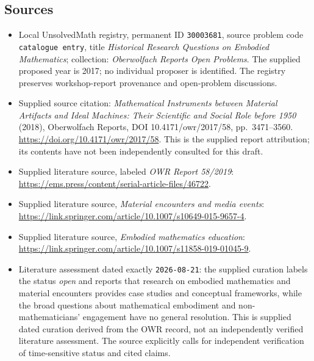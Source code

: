 \documentclass[11pt]{article}
\begin{document}
\subsection{Sources}
\begin{itemize}
\item Local UnsolvedMath registry, permanent ID \texttt{30003681}, source problem code \texttt{catalogue entry}, title \emph{Historical Research Questions on Embodied Mathematics}; collection: \emph{Oberwolfach Reports Open Problems}. The supplied proposed year is 2017; no individual proposer is identified. The registry preserves workshop-report provenance and open-problem discussions.
\item Supplied source citation: \emph{Mathematical Instruments between Material Artifacts and Ideal Machines: Their Scientific and Social Role before 1950} (2018), Oberwolfach Reports, DOI 10.4171/owr/2017/58, pp.\ 3471--3560. \url{https://doi.org/10.4171/owr/2017/58}. This is the supplied report attribution; its contents have not been independently consulted for this draft.
\item Supplied literature source, labeled \emph{OWR Report 58/2019}: \url{https://ems.press/content/serial-article-files/46722}.
\item Supplied literature source, \emph{Material encounters and media events}: \url{https://link.springer.com/article/10.1007/s10649-015-9657-4}.
\item Supplied literature source, \emph{Embodied mathematics education}: \url{https://link.springer.com/article/10.1007/s11858-019-01045-9}.
\item Literature assessment dated exactly \texttt{2026-08-21}: the supplied curation labels the status \emph{open} and reports that research on embodied mathematics and material encounters provides case studies and conceptual frameworks, while the broad questions about mathematical embodiment and non-mathematicians' engagement have no general resolution. This is supplied dated curation derived from the OWR record, not an independently verified literature assessment. The source explicitly calls for independent verification of time-sensitive status and cited claims.
\end{itemize}
\end{document}
